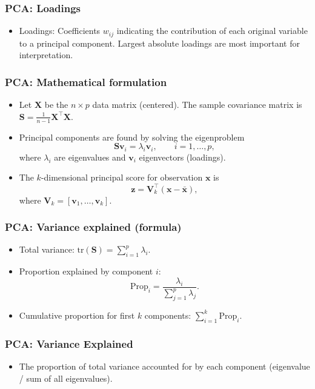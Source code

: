 \documentclass{beamer}
\begin{document}
\begin{frame}
    \frametitle{PCA: Loadings}
    \begin{itemize}
        \item Loadings: Coefficients $w_{ij}$ indicating the contribution of each original variable to a principal component. Largest absolute loadings are most important for interpretation.
    \end{itemize}
\end{frame}

\begin{frame}
    \frametitle{PCA: Mathematical formulation}
    \begin{itemize}
        \item Let $\mathbf{X}$ be the $n\times p$ data matrix (centered). The sample covariance matrix is $\mathbf{S}=\frac{1}{n-1}\mathbf{X}^\top\mathbf{X}$.
        \item Principal components are found by solving the eigenproblem
        \[\mathbf{S}\mathbf{v}_i=\lambda_i\mathbf{v}_i,\qquad i=1,\dots,p,
        \]
        where $\lambda_i$ are eigenvalues and $\mathbf{v}_i$ eigenvectors (loadings).
        \item The $k$-dimensional principal score for observation $\mathbf{x}$ is
        \[\mathbf{z}=\mathbf{V}_k^\top(\mathbf{x}-\bar{\mathbf{x}}),\]
        where $\mathbf{V}_k=[\mathbf{v}_1,\dots,\mathbf{v}_k]$.
    \end{itemize}
\end{frame}

\begin{frame}
    \frametitle{PCA: Variance explained (formula)}
    \begin{itemize}
        \item Total variance: $\mathrm{tr}(\mathbf{S})=\sum_{i=1}^p\lambda_i$.
        \item Proportion explained by component $i$:
        \[\mathrm{Prop}_i=\frac{\lambda_i}{\sum_{j=1}^p\lambda_j}.\]
        \item Cumulative proportion for first $k$ components: $\sum_{i=1}^k\mathrm{Prop}_i$.
    \end{itemize}
\end{frame}

\begin{frame}
    \frametitle{PCA: Variance Explained}
    \begin{itemize}
        \item The proportion of total variance accounted for by each component (eigenvalue / sum of all eigenvalues).
    \end{itemize}
\end{frame}
\end{document}
